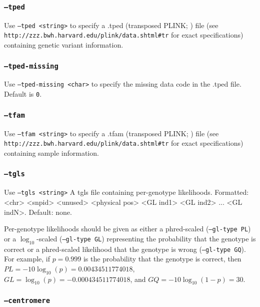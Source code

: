 \documentclass[12pt]{article}%
\begin{document}
\subsubsection{{\tt --tped}}

Use {\tt --tped <string>} to specify a .tped (transposed PLINK; \cite{PurcellEtAl07}) file (see \\{\tt http://zzz.bwh.harvard.edu/plink/data.shtml\#tr} for exact specifications) containing genetic variant information.  

\subsubsection{{\tt --tped-missing}}

Use {\tt --tped-missing <char>} to specify the missing data code in the .tped file.  Default is {\tt 0}.  


\subsubsection{{\tt --tfam}}

Use {\tt --tfam <string>} to specify a .tfam (transposed PLINK; \cite{PurcellEtAl07}) file (see \\{\tt http://zzz.bwh.harvard.edu/plink/data.shtml\#tr} for exact specifications) containing sample information.

\subsubsection{{\tt --tgls}}

Use {\tt --tgls <string>} A tgls file containing per-genotype likelihoods. Formatted: <chr> <snpid> <unused> <physical pos> <GL ind1> <GL ind2> ... <GL indN>. Default: none.

Per-genotype likelihoods should be given as either a phred-scaled ({\tt --gl-type PL}) or a $\log_{10}$-scaled ({\tt --gl-type GL}) representing the probability that the genotype is correct or a phred-scaled likelihood that the genotype is wrong ({\tt --gl-type GQ}).  For example, if $p = 0.999$ is the probability that the genotype is correct, then $PL = -10\log_{10}(p) = 0.00434511774018$, $GL = \log_{10}(p) = -0.000434511774018$, and $GQ = -10\log_{10}(1-p) = 30$.

\subsubsection{{\tt --centromere}}
\end{document}
